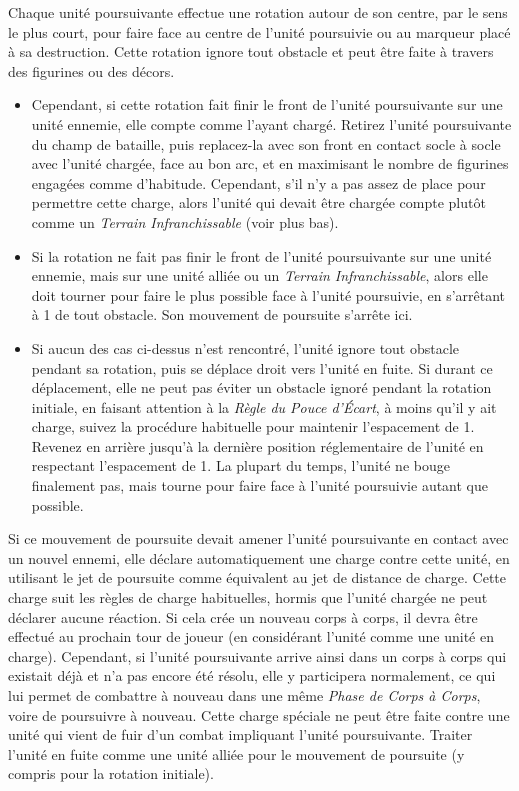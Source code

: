 Chaque unité poursuivante effectue une rotation autour de son centre, par le sens le plus court, pour faire face au centre de l'unité poursuivie ou au marqueur placé à sa destruction. Cette rotation ignore tout obstacle et peut être faite à travers des figurines ou des décors.
\begin{itemize}[label={-}]
\item Cependant, si cette rotation fait finir le front de l'unité poursuivante sur une unité ennemie, elle compte comme l'ayant chargé. Retirez l'unité poursuivante du champ de bataille, puis replacez-la avec son front en contact socle à socle avec l'unité chargée, face au bon arc, et en maximisant le nombre de figurines engagées comme d'habitude. Cependant, s'il n'y a pas assez de place pour permettre cette charge, alors l'unité qui devait être chargée compte plutôt comme un \emph{Terrain Infranchissable} (voir plus bas).
\item Si la rotation ne fait pas finir le front de l'unité poursuivante sur une unité ennemie, mais sur une unité alliée ou un \emph{Terrain Infranchissable}, alors elle doit tourner pour faire le plus possible face à l'unité poursuivie, en s'arrêtant à 1{\pouce} de tout obstacle. Son mouvement de poursuite s'arrête ici.
\item Si aucun des cas ci-dessus n'est rencontré, l'unité ignore tout obstacle pendant sa rotation, puis se déplace droit vers l'unité en fuite. Si durant ce déplacement, elle ne peut pas éviter un obstacle ignoré pendant la rotation initiale, en faisant attention à la \emph{Règle du Pouce d'Écart}, à moins qu'il y ait charge, suivez la procédure habituelle pour maintenir l'espacement de 1{\pouce}. Revenez en arrière jusqu'à la dernière position réglementaire de l'unité en respectant l'espacement de 1{\pouce}. La plupart du temps, l'unité ne bouge finalement pas, mais tourne pour faire face à l'unité poursuivie autant que possible.
\end{itemize}

Si ce mouvement de poursuite devait amener l'unité poursuivante en contact avec un nouvel ennemi, elle déclare automatiquement une charge contre cette unité, en utilisant le jet de poursuite comme équivalent au jet de distance de charge. Cette charge suit les règles de charge habituelles, hormis que l'unité chargée ne peut déclarer aucune réaction. Si cela crée un nouveau corps à corps, il devra être effectué au prochain tour de joueur (en considérant l'unité comme une unité en charge). Cependant, si l'unité poursuivante arrive ainsi dans un corps à corps qui existait déjà et n'a pas encore été résolu, elle y participera normalement, ce qui lui permet de combattre à nouveau dans une même \emph{Phase de Corps à Corps}, voire de poursuivre à nouveau. Cette charge spéciale ne peut être faite contre une unité qui vient de fuir d'un combat impliquant l'unité poursuivante. Traiter l'unité en fuite comme une unité alliée pour le mouvement de poursuite (y compris pour la rotation initiale).

